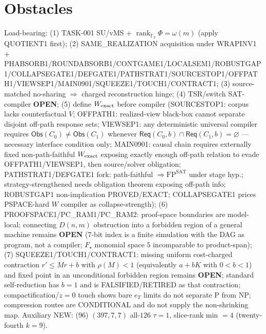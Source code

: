 \documentclass[11pt]{article}
\begin{document}
\section*{Obstacles}
Load-bearing: (1) TASK-001 SU/vMS + $\operatorname{rank}_{\mathbb F_2}\Phi=\omega(m)$ (apply QUOTIENT1 first);
(2) SAME\_REALIZATION acquisition under WRAPINV1 + PHABSORB1/ROUNDABSORB1/CONTGAME1/LOCALSEM1/ROBUSTGAP1/COLLAPSEGATE1/DEFGATE1/PATHSTRAT1/SOURCESTOP1/OFFPATH1/VIEWSEP1/MAIN0901/SQUEEZE1/TOUCH1/CONTRACT1;
(3) source-matched no-sharing $\Rightarrow$ charged reconstruction hinge;
(4) TSR/switch SAT-compiler \textbf{OPEN};
(5) define $W_{\rm exact}$ before compiler (SOURCESTOP1: corpus lacks counterfactual $V$;
OFFPATH1: realized-view black-box cannot separate disjoint off-path response sets;
VIEWSEP1: any deterministic universal compiler requires $\mathsf{Obs}(C_0)\ne\mathsf{Obs}(C_1)$
whenever $\mathsf{Req}(C_0,b)\cap\mathsf{Req}(C_1,b)=\varnothing$ --- necessary interface condition only;
MAIN0901: causal chain requires externally fixed non-path-faithful $W_{\rm exact}$ exposing
exactly enough off-path relation to evade OFFPATH1/VIEWSEP1, then source/solver obligation;
PATHSTRAT1/DEFGATE1 fork: path-faithful $\Rightarrow\mathrm{FP}^{\mathrm{SAT}}$ under stage hyp.;
strategy-strengthened needs obligation theorem exposing off-path info;
ROBUSTGAP1 non-implication PROVED/EXACT; COLLAPSEGATE1 prices PSPACE-hard $W$ compiler as collapse-strength);
(6) PROOFSPACE1/PC\_RAM1/PC\_RAM2: proof-space boundaries are model-local; connecting $D(n,m)$ obstruction into a
forbidden region of a general machine remains \textbf{OPEN} ($7$-bit index is a finite simulation with the DAG as program, not a compiler; $F_\star$ monomial space $5$ incomparable to product-span);
(7) SQUEEZE1/TOUCH1/CONTRACT1: missing uniform cost-charged contraction $r'\le Mr+b$ with $\rho(M){<}1$ (equivalently $a+bK$ with $0{<}b{<}1$) and fixed point in an unconditional forbidden region remains \textbf{OPEN};
standard self-reduction has $b{=}1$ and is FALSIFIED/RETIRED as that contraction; compactification/$z{=}0$ touch shows bare $e_T$ limits do not separate P from NP;
compression routes are CONDITIONAL and do not supply the non-shrinking map.
Auxiliary NEW: (96) $(397,7,7)$ all-$126$ $\tau{=}1$, slice-rank min $=4$ (twenty-fourth $k{=}9$).
\end{document}

